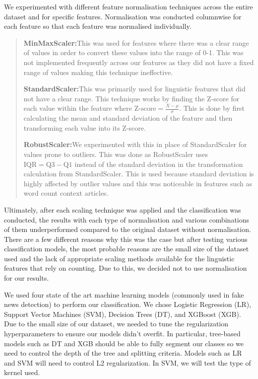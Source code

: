 \documentclass{article}
\begin{document}

We experimented with different feature normalisation techniques across the entire dataset and for specific features. Normalisation was conducted columnwise for each feature so that each feature was normalised individually.

\begin{quote}
  \textbf{MinMaxScaler:}\quad This was used for features where there was a clear range of values in order to convert these values into the range of 0-1. This was not implemented frequently across our features as they did not have a fixed range of values making this technique ineffective.

  \textbf{StandardScaler:}\quad This was primarily used for linguistic features that did not have a clear range. This technique works by finding the Z-score for each value within the feature where $\text{Z-score} = \frac{X - \mu}{\sigma}$. This is done by first calculating the mean and standard deviation of the feature and then transforming each value into its Z-score.

  \textbf{RobustScaler:}\quad We experimented with this in place of StandardScaler for values prone to outliers. This was done as RobustScaler uses $\text{IQR} = \text{Q3} - \text{Q1}$ instead of the standard deviation in the transformation calculation from StandardScaler. This is used because standard deviation is highly affected by outlier values and this was noticeable in features such as word count context articles.
\end{quote}

Ultimately, after each scaling technique was applied and the classification was conducted, the results with each type of normalisation and various combinations of them underperformed compared to the original dataset without normalisation. There are a few different reasons why this was the case but after testing various classification models, the most probable reasons are the small size of the dataset used and the lack of appropriate scaling methods available for the linguistic features that rely on counting. Due to this, we decided not to use normalisation for our results.


\label{section:machine-learning}

We used four state of the art machine learning models (commonly used in fake news detection) to perform our classification. We chose Logistic Regression (LR), Support Vector Machines (SVM), Decision Trees (DT), and XGBoost (XGB). Due to the small size of our dataset, we needed to tune the regularization hyperparameters to ensure our models didn't overfit. In particular, tree-based models such as DT and XGB should be able to fully segment our classes so we need to control the depth of the tree and splitting criteria. Models such as LR and SVM will need to control L2 regularization. In SVM, we will test the type of kernel used.
\end{document}
